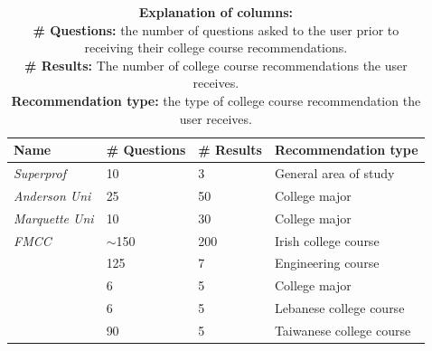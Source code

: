 \begin{table}[H]
    \centering
\caption{Comparing features of all examined closely-related work (Part 1)}
\begin{tabular}{ |p{4cm}|p{3cm}|p{3cm}|p{5cm}|}
 \hline
 \textbf{Name} & \textbf{\# Questions} & \textbf{\# Results} & \textbf{Recommendation type}\\
 \hline
\emph{Superprof}    & 10     & 3        & General area of study\\
\hline
\emph{Anderson Uni}     & 25     & 50       & College major\\
\hline
\emph{Marquette Uni}    & 10     & 30       & College major\\
\hline
\emph{FMCC}         & $\sim$150 & 200   & Irish college course\\
\hline
\emph{\cite{qamhieh2020pcrs}}         & 125 & 7        & Engineering course\\
\hline
\emph{\cite{ghuge2023envisioning}}  & 6      & 5        & College major\\
\hline
\emph{\cite{lahoud2023comparative}}  & 6  & 5     & Lebanese college course\\
\hline
\emph{\cite{su2021personality}}  & 90     & 5  & Taiwanese college course\\
\hline
\end{tabular}
\caption*{\textbf{Explanation of columns:}\\\textbf{\# Questions:} the number of questions asked to the user prior to receiving their college course recommendations.\\\textbf{\# Results:} The number of college course recommendations the user receives.\\\textbf{Recommendation type:} the type of college course recommendation the user receives.}
\label{tab:research-gap-1}
\end{table}

